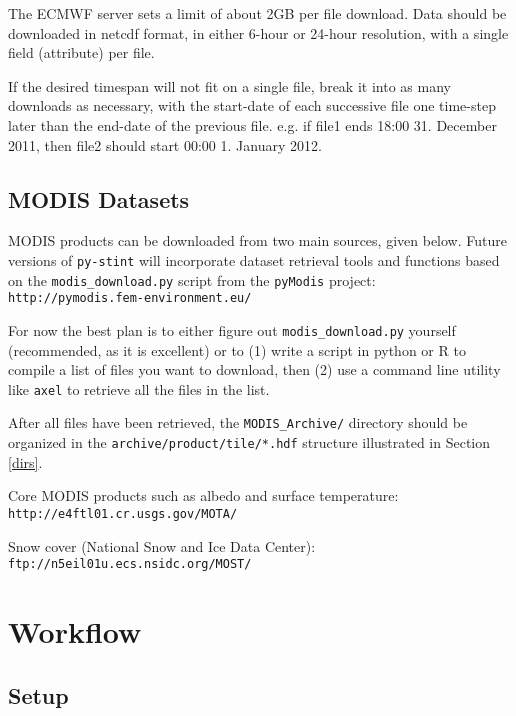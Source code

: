 \documentclass[twoside,a4paper]{refart}
\begin{document}
\attention
The ECMWF server sets a limit of about 2GB per file download.  Data should be downloaded in netcdf format, in either 6-hour or 24-hour resolution, with a single field (attribute) per file. 

If the desired timespan will not fit on a single file, break it into as many downloads as necessary, with the start-date of each successive file one time-step later than the end-date of the previous file. e.g. if file1 ends 18:00 31. December 2011, then file2 should start 00:00 1. January 2012.

\subsection{MODIS Datasets}\label{modis}
MODIS products can be downloaded from two main sources, given below.  Future versions of \texttt{py-stint} will incorporate dataset retrieval tools and functions based on the \texttt{modis\_download.py} script from the \texttt{pyModis} project:
\texttt{http://pymodis.fem-environment.eu/}

 For now the best plan is to either figure out \texttt{modis\_download.py} yourself (recommended, as it is excellent) or to (1) write a script in python or R to compile a list of files you want to download, then (2) use a command line utility like \texttt{axel} to retrieve all the files in the list.

After all files have been retrieved, the \texttt{MODIS\_Archive/} directory should be organized in the \texttt{archive/product/tile/*.hdf} structure illustrated in Section \ref{dirs}. 

Core MODIS products such as albedo and surface temperature:\\
\texttt{http://e4ftl01.cr.usgs.gov/MOTA/}


Snow cover (National Snow and Ice Data Center):\\
\texttt{ftp://n5eil01u.ecs.nsidc.org/MOST/}


\section{Workflow}\label{run}

\subsection{Setup}
\end{document}
